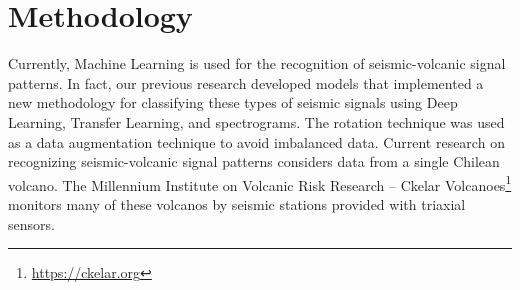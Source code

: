 \documentclass[journal]{IEEEtran}
\begin{document}
\section{Methodology}\label{methodology}
Currently, Machine Learning is used for the recognition of seismic-volcanic signal patterns.
In fact, our previous research developed\cite{mythesismaster,salazar2022multi} models that implemented a new methodology for classifying these types of seismic signals using Deep Learning, Transfer Learning, and spectrograms. The rotation technique was used as a data augmentation technique to avoid imbalanced data.
Current research on recognizing seismic-volcanic signal patterns considers data from a single Chilean volcano. The Millennium Institute on Volcanic Risk Research – Ckelar Volcanoes\footnote{\href{https://ckelar.org}{\color{blue}https://ckelar.org}} monitors many of these volcanos by seismic stations provided with triaxial sensors.
\end{document}
